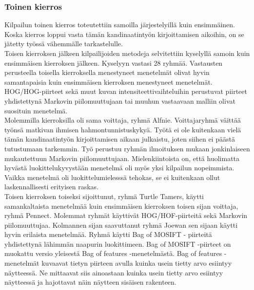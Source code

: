 \subsubsection {Toinen kierros}

Kilpailun toinen kierros toteutettiin samoilla järjestelyillä kuin ensimmäinen. Koska kierros loppui
vasta tämän kandinaatintyön kirjoittamisen aikoihin, on se jätetty työssä vähemmälle tarkastelulle.\\

Toisen kierroksen jälkeen kilpailijoiden metodeja selvitettiin kyselyllä samoin kuin ensimmäisen
kierroksen jälkeen. Kyselyyn vastasi 28 ryhmää. Vastausten perusteella toisella kierroksella menestyneet 
menetelmät olivat hyvin samantapaisia kuin ensimmäisen kierroksen menestyneet menetelmät. HOG/HOG-piirteet sekä muut
kuvan intensiteettivaihteluihin perustuvat piirteet yhdistettynä Markovin piilomuuttujaan tai muuhun
vastaavaan malliin olivat suosituin menetelmä. \citep{chalearn2}\\

Molemmilla kierroksilla oli sama voittaja, ryhmä Alfnie. 
Voittajaryhmä väittää työnsä matkivan ihmisen hahmontunnistuskykyä. Työtä ei ole kuitenkaan vielä tämän kandinaatintyön kirjoittamisen aikaan julkaistu,
 joten siihen ei päästä tutustumaan tarkemmin. Työ perustuu
ryhmän ilmoituksen mukaan jonkinlaiseen mukautettuun Markovin piilomuuttujaan. Mielenkiintoista on,
että huolimatta hyvästä luokittelukyvystään menetelmä oli myös yksi kilpailun nopeimmista. Vaikka menetelmä oli 
luokittelumielesssä tehokas, se ei kuitenkaan ollut laskennallisesti erityisen raskas. \citep{chalearn2}\\

Toisen kierroksen toiseksi sijoittunut, ryhmä Turtle Tamers, käytti samankaltaista menetelmää kuin 
ensimmäisen kierroksen toisen sijan voittaja, ryhmä Pennect. Molemmat ryhmät käyttivät HOG/HOF-piirteitä sekä Markovin piilomuuttujaa. 
Kolmannen sijan saavuttanut ryhmä Joewan sen sijaan käytti hyvin erilaista menetelmää. Ryhmä käytti Bag of MOSIFT -
piirteitä yhdistettynä lähimmän naapurin luokittimeen. \citep{chalearn2} Bag of MOSIFT -piirteet on muokattu versio
yleisestä Bag of features -menetelmästä. Bag of features -menetelmät kuvaavat tietyn piirteen avulla
kuinka usein tietty arvo esiintyy näytteessä. Ne mittaavat siis ainoastaan kuinka usein tietty arvo esiintyy näytteessä ja
hajottavat näin näytteen sisäisen rakenteen.\citep{bagoffeatures} \\

